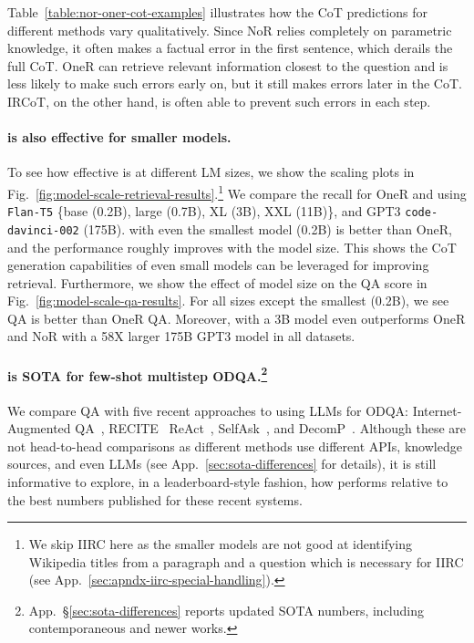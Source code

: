 Table~\ref{table:nor-oner-cot-examples} illustrates how the CoT predictions for different methods vary qualitatively. Since NoR relies completely on parametric knowledge, it often makes a factual error in the first sentence, which derails the full CoT. OneR can retrieve relevant information closest to the question and is less likely to make such errors early on, but it still makes errors later in the CoT. IRCoT, on the other hand, is often able to prevent such errors in each step.

\paragraph{\iconsys is also effective for smaller models.}

To see how effective \iconsys is at different LM sizes, we show the scaling plots in Fig.~\ref{fig:model-scale-retrieval-results}.\footnote{We skip IIRC here as the smaller models are not good at identifying Wikipedia titles from a paragraph and a question which is necessary for IIRC (see App.~\ref{sec:apndx-iirc-special-handling}).} We compare the recall for OneR and \iconsys using \texttt{Flan-T5} \{base (0.2B), large (0.7B), XL (3B), XXL (11B)\}, and GPT3 \texttt{code-davinci-002} (175B). \iconsys with even the smallest model (0.2B) is better than OneR, and the performance roughly improves with the model size. This shows the CoT generation capabilities of even small models can be leveraged for improving retrieval. Furthermore, we show the effect of model size on the QA score in Fig.~\ref{fig:model-scale-qa-results}. For all sizes except the smallest (0.2B), we see \iconsys QA is better than OneR QA. Moreover, \iconsys with a 3B model even outperforms OneR and NoR with a 58X larger 175B GPT3 model in all datasets.

\paragraph{\iconsys is SOTA for few-shot multistep ODQA.\footnote{\label{footnote:sota}App.~\S\ref{sec:sota-differences} reports updated SOTA numbers, including contemporaneous and newer works.}}

We compare \iconsys QA with five recent approaches to using LLMs for ODQA: Internet-Augmented QA~\cite{internet-augmented-qa}, RECITE~\cite{recitationlm} ReAct~\cite{react}, SelfAsk~\cite{selfask}, and DecomP~\cite{old-decomp}. Although these are not head-to-head comparisons as different methods use different APIs, knowledge sources, and even LLMs (see App.~\ref{sec:sota-differences} for details), it is still informative to explore, in a leaderboard-style fashion, how \iconsys performs relative to the best numbers published for these recent systems.


